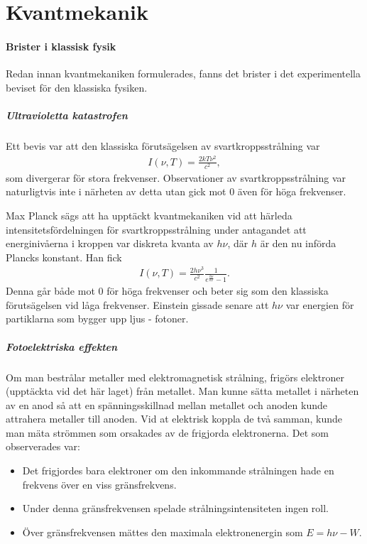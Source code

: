 \section{Kvantmekanik}

\paragraph{Brister i klassisk fysik}
Redan innan kvantmekaniken formulerades, fanns det brister i det experimentella beviset för den klassiska fysiken.

\subparagraph{Ultravioletta katastrofen}
Ett bevis var att den klassiska förutsägelsen av svartkroppsstrålning var
\begin{align*}
	I(\nu, T) = \frac{2kT\nu^{2}}{c^{2}},
\end{align*}
som divergerar för stora frekvenser. Observationer av svartkroppsstrålning var naturligtvis inte i närheten av detta utan gick mot $0$ även för höga frekvenser.

Max Planck sägs att ha upptäckt kvantmekaniken vid att härleda intensitetsfördelningen för svartkroppsstrålning under antagandet att energinivåerna i kroppen var diskreta kvanta av $h\nu$, där $h$ är den nu införda Plancks konstant. Han fick
\begin{align*}
	I(\nu, T) = \frac{2h\nu^{3}}{c^{2}}\frac{1}{e^{\frac{h\nu}{kT}} - 1}.
\end{align*}
Denna går både mot $0$ för höga frekvenser och beter sig som den klassiska förutsägelsen vid  låga frekvenser. Einstein gissade senare att $h\nu$ var energien för partiklarna som bygger upp ljus - fotoner.

\subparagraph{Fotoelektriska effekten}
Om man bestrålar metaller med elektromagnetisk strålning, frigörs elektroner (upptäckta vid det här laget) från metallet. Man kunne sätta metallet i närheten av en anod så att en spänningsskillnad mellan metallet och anoden kunde attrahera metaller till anoden. Vid at elektrisk koppla de två samman, kunde man mäta strömmen som orsakades av de frigjorda elektronerna. Det som observerades var:
\begin{itemize}
	\item Det frigjordes bara elektroner om den inkommande strålningen hade en frekvens över en viss gränsfrekvens.
	\item Under denna gränsfrekvensen spelade strålningsintensiteten ingen roll.
	\item Över gränsfrekvensen mättes den maximala elektronenergin som $E = h\nu - W$.
\end{itemize}

